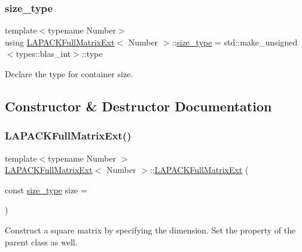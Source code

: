 \subsubsection{\texorpdfstring{size\+\_\+type}{size\_type}}
{\footnotesize\ttfamily template$<$typename Number$>$ \\
using \hyperlink{classLAPACKFullMatrixExt}{L\+A\+P\+A\+C\+K\+Full\+Matrix\+Ext}$<$ Number $>$\+::\hyperlink{classLAPACKFullMatrixExt_a5cf5f4a6104dc17029210b5ca52bf574}{size\+\_\+type} =  std\+::make\+\_\+unsigned$<$types\+::blas\+\_\+int$>$\+::type}

Declare the type for container size. 

\subsection{Constructor \& Destructor Documentation}
\mbox{\label{classLAPACKFullMatrixExt_a1d2edf7f0eb1f079e1d9540f89b6584e}} 
\subsubsection{\texorpdfstring{L\+A\+P\+A\+C\+K\+Full\+Matrix\+Ext()}{LAPACKFullMatrixExt()}\hspace{0.1cm}{\footnotesize\ttfamily [1/10]}}
{\footnotesize\ttfamily template$<$typename Number $>$ \\
\hyperlink{classLAPACKFullMatrixExt}{L\+A\+P\+A\+C\+K\+Full\+Matrix\+Ext}$<$ Number $>$\+::\hyperlink{classLAPACKFullMatrixExt}{L\+A\+P\+A\+C\+K\+Full\+Matrix\+Ext} (\begin{DoxyParamCaption}\item[{const \hyperlink{classLAPACKFullMatrixExt_a5cf5f4a6104dc17029210b5ca52bf574}{size\+\_\+type}}]{size = {} }\end{DoxyParamCaption})}

Construct a square matrix by specifying the dimension. Set the property of the parent class as well.\mbox{\label{classLAPACKFullMatrixExt_a82986acedd4e702133151cb9a3ae2c97}} 
